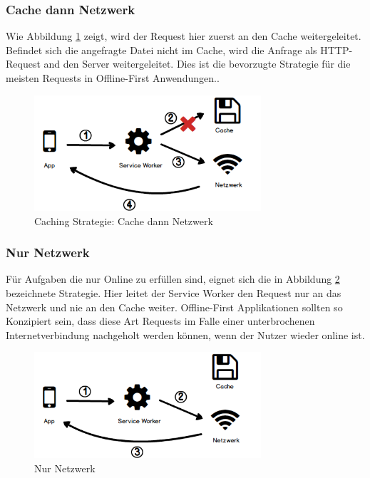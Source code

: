 \documentclass[a4paper, 12pt]{scrreprt}
\begin{document}
\subsubsection{Cache dann Netzwerk}
Wie Abbildung \ref{fig:cachingCacheFirst} zeigt, wird der Request hier zuerst an den Cache weitergeleitet. Befindet sich die angefragte Datei nicht im Cache, wird die Anfrage als HTTP-Request and den Server weitergeleitet. Dies ist die bevorzugte Strategie für die meisten Requests in Offline-First Anwendungen.\autocite[Kapitel 05]{BookBuildingPWAs}.

\begin{figure}[h]
	\centering
	\includegraphics[width=0.75\textwidth]{cachefirst.png}
	\caption{Caching Strategie: Cache dann Netzwerk}
	\label{fig:cachingCacheFirst}
\end{figure}

\subsubsection{Nur Netzwerk}
Für Aufgaben die nur Online zu erfüllen sind, eignet sich die in Abbildung \ref{fig:cachingNetworkOnly} bezeichnete Strategie. Hier leitet der Service Worker den Request nur an das Netzwerk und nie an den Cache weiter. Offline-First Applikationen sollten so Konzipiert sein, dass diese Art Requests im Falle einer unterbrochenen Internetverbindung nachgeholt werden können, wenn der Nutzer wieder online ist.

\begin{figure}[h]
	\centering
	\includegraphics[width=0.75\textwidth]{networkonly.png}
	\caption{Nur Netzwerk}
	\label{fig:cachingNetworkOnly}
\end{figure}
\end{document}
